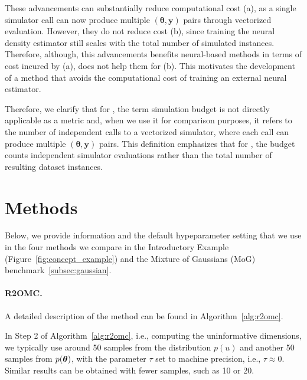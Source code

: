 These advancements can substantially reduce computational cost (a), as a single simulator call can now produce multiple $(\boldsymbol{\theta}, \mathbf{y})$ pairs through vectorized evaluation. However, they do not reduce cost (b), since training the neural density estimator still scales with the total number of simulated instances.
Therefore, although, this advancements benefits neural-based methods in terms of cost incured by (a), does not help them for (b).
This motivates the development of a method that avoids the computational cost of training an external neural estimator.

Therefore, we clarify that for \rromc, the term simulation budget is not directly applicable as a metric and, when we use it for comparison purposes, it refers to the number of independent calls to a vectorized simulator, where each call can produce multiple $(\boldsymbol{\theta}, \mathbf{y})$ pairs.
This definition emphasizes that for \rromc, the budget counts independent simulator evaluations rather than the total number of resulting dataset instances.


\clearpage

\section{Methods}
\label{app-sec:methods}

Below, we provide information and the default hypeparameter setting that we use in the four methods we compare in the Introductory Example (Figure~\ref{fig:concept_example}) and the Mixture of Gaussians (MoG) benchmark~\ref{subsec:gaussian}.

\paragraph{R2OMC.}

A detailed description of the method can be found in Algorithm~\ref{alg:r2omc}. 

In Step 2 of Algorithm~\ref{alg:r2omc}, i.e., computing the uninformative dimensions, we typically use around 50 samples from the distribution \(p(u)\) and another 50 samples from \(p(\boldsymbol{\theta})\), with the parameter \(\tau\) set to machine precision, i.e., \(\tau \approx 0\). Similar results can be obtained with fewer samples, such as 10 or 20.

